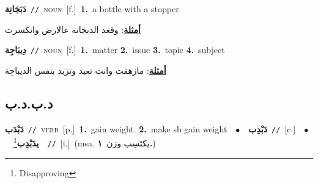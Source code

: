 \documentclass[10pt,a4paper,twoside]{article} %
\begin{document}
\begin{multicols}{2}
{\setlength\topsep{0pt}\textbf{\foreignlanguage{arabic}{دَبَجَانِة}}\ {\color{gray}\texttt{//}\color{black}}\ \textsc{noun}\ [f.]\ \textbf{1.}~a bottle with a stopper\  \begin{flushright}\color{gray}\foreignlanguage{arabic}{\textbf{\underline{\foreignlanguage{arabic}{أمثلة}}}: وقعد الدبجانة عالارض وانكسرت}\end{flushright}\color{black}} \vspace{2mm}

{\setlength\topsep{0pt}\textbf{\foreignlanguage{arabic}{دِيبَاجِة}}\ {\color{gray}\texttt{//}\color{black}}\ \textsc{noun}\ [f.]\ \textbf{1.}~matter  \textbf{2.}~issue  \textbf{3.}~topic  \textbf{4.}~subject\  \begin{flushright}\color{gray}\foreignlanguage{arabic}{\textbf{\underline{\foreignlanguage{arabic}{أمثلة}}}: مازهقت وانت تعيد وتزيد بنفس الديباجِة}\end{flushright}\color{black}} \vspace{2mm}

\vspace{-3mm}
\subsection*{\color{blue}\foreignlanguage{arabic}{د.ب.د.ب}\color{blue}{}} 

{\setlength\topsep{0pt}\textbf{\foreignlanguage{arabic}{دَبْدَب}}\ {\color{gray}\texttt{//}\color{black}}\ \textsc{verb}\ [p.]\ \textbf{1.}~gain weight.  \textbf{2.}~make sb gain weight\ \ $\bullet$\ \ \setlength\topsep{0pt}\textbf{\foreignlanguage{arabic}{دَبْدِب}}\ {\color{gray}\texttt{//}\color{black}}\ [c.]\ \ $\bullet$\ \ \setlength\topsep{0pt}\textbf{\foreignlanguage{arabic}{يدَبْدِب}}\footnote{Disapproving}\ \ {\color{gray}\texttt{//}\color{black}}\ [i.]\ \color{gray}(msa. \foreignlanguage{arabic}{يكتَسِب وزن}~\foreignlanguage{arabic}{\textbf{١.}})\color{black}\ } \vspace{2mm}


\end{multicols}
\end{document}

